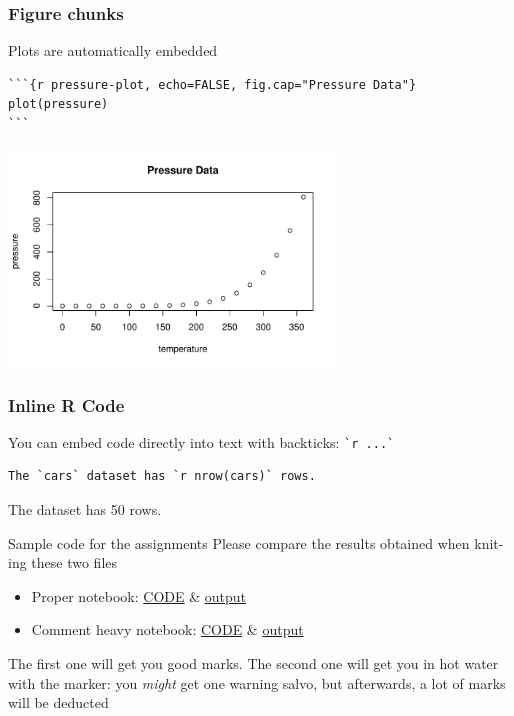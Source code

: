 \documentclass[aspectratio=169]{beamer}\usepackage[]{graphicx}\usepackage[]{xcolor}
\newenvironment{knitrout}{}{} %
\begin{document}
\begin{frame}[fragile]
  \frametitle{Figure chunks}
  Plots are automatically embedded
\begin{lstlisting}
```{r pressure-plot, echo=FALSE, fig.cap="Pressure Data"}
plot(pressure)
```
\end{lstlisting}

\begin{center}
\begin{knitrout}
\color{fgcolor}
\includegraphics[width=0.65\textwidth]{FIGS/L02-pressure-plot-rmd-1} 
\end{knitrout}
\end{center}
\end{frame}

\begin{frame}[fragile]
  \frametitle{Inline R Code}
  You can embed  code directly into text with backticks: \verb|`r ...`|
  \vfill
\begin{lstlisting}
The `cars` dataset has `r nrow(cars)` rows.
\end{lstlisting}
  \vfill
  The  dataset has 50 rows.
\end{frame}




\begin{frame}{Sample code for the assignments}
Please compare the results obtained when knit-ing these two files
\vfill
\begin{itemize}
\item Proper notebook: \href{https://raw.githubusercontent.com/julien-arino/math-of-data-science/refs/heads/main/CODE/iris_analysis_proper.Rmd}{CODE} \& \href{https://julien-arino.github.io/math-of-data-science/CODE/iris_analysis_proper.html}{output}
\vfill
\item Comment heavy notebook: \href{https://raw.githubusercontent.com/julien-arino/math-of-data-science/refs/heads/main/CODE/iris_analysis_commented.Rmd}{CODE} \& \href{https://julien-arino.github.io/math-of-data-science/CODE/iris_analysis_commented.html}{output} 
\end{itemize}
\vfill
The first one will get you good marks. The second one will get you in hot water with the marker: you \emph{might} get one warning salvo, but afterwards, a lot of marks will be deducted
\end{frame}
\end{document}
